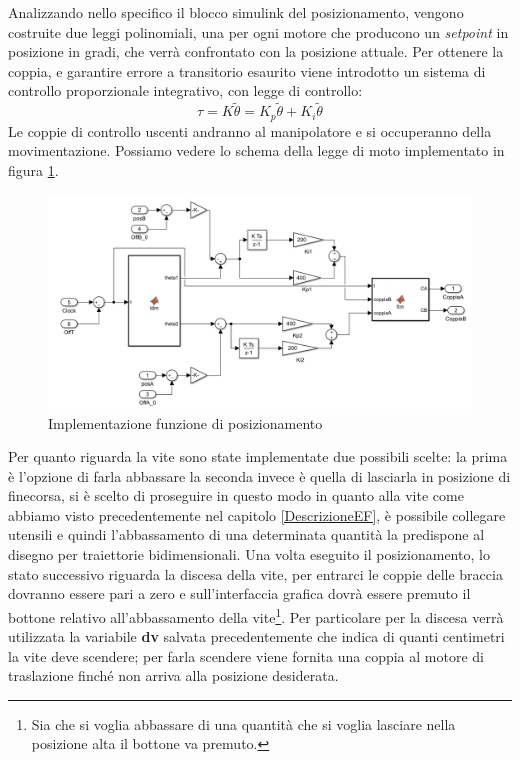 Analizzando nello specifico il blocco simulink del posizionamento, vengono costruite due leggi polinomiali, una per ogni motore che producono un \textit{setpoint} in posizione in gradi, che verrà confrontato con la posizione attuale. Per ottenere la coppia, e garantire errore a transitorio esaurito viene introdotto un sistema di controllo proporzionale integrativo, con legge di controllo: 
\begin{equation*}
\tau = K \tilde{\theta} =  K_p\tilde{\theta} + K_i\tilde{\theta}
\end{equation*}
Le coppie di controllo uscenti andranno al manipolatore e si occuperanno della movimentazione. Possiamo vedere lo schema della legge di moto implementato in figura \ref{fig:ImpPos}.
\begin{figure}[ht]
	\begin{center}
		\includegraphics[scale=0.6]{Immagini/Sperimentale/LdmPosizionamento}
		\caption{Implementazione funzione di posizionamento}
		\label{fig:ImpPos}
	\end{center}
\end{figure}
Per quanto riguarda la vite sono state implementate due possibili scelte: la prima è l'opzione di farla abbassare la seconda invece è quella di lasciarla in posizione di finecorsa, si è scelto di proseguire in questo modo in quanto alla vite come abbiamo visto precedentemente nel capitolo \ref{DescrizioneEF},  è possibile collegare utensili e quindi l'abbassamento di una determinata quantità la predispone al disegno per traiettorie bidimensionali. 
Una volta eseguito il posizionamento, lo stato successivo riguarda la discesa della vite, per entrarci le coppie delle braccia dovranno essere pari a zero e sull'interfaccia grafica dovrà essere premuto il bottone relativo all'abbassamento della vite\footnote{Sia che si voglia abbassare di una quantità che si voglia lasciare nella posizione alta il bottone va premuto.}. Per particolare per la discesa verrà utilizzata la variabile \textbf{dv} salvata precedentemente che indica di quanti centimetri la vite deve scendere; per farla scendere viene fornita una coppia al motore di traslazione finché non arriva alla posizione desiderata.
